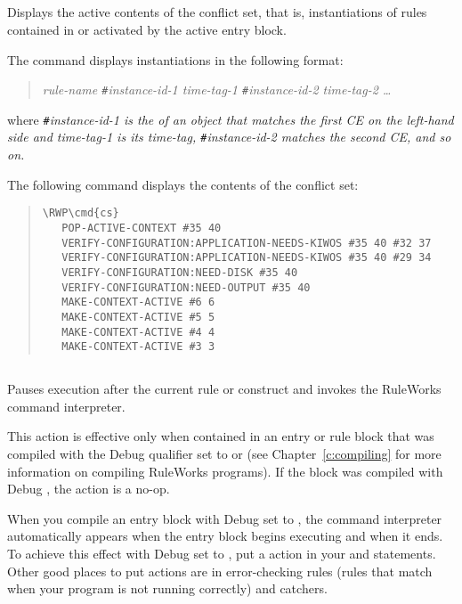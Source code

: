 \subsection{}

Displays the active contents of the conflict set, that is,
instantiations of rules contained in or activated by the active entry
block.

The command displays instantiations in the following format:
\begin{quote}
  \it{rule-name} \verb|#|\it{instance-id-1} \it{time-tag-1}
  \verb|#|\it{instance-id-2} \it{time-tag-2} \ldots
\end{quote}
where \verb|#|\it{instance-id-1} is the  of an object
that matches the first CE on the left-hand side and \it{time-tag-1} is
its time-tag, \verb|#|\it{instance-id-2} matches the second CE, and so
on.

\Format


\Example

The following command displays the contents of the conflict set:

\begin{quote}
\begin{Verbatim}[commandchars=\\\{\}]
\RWP\cmd{cs}
   POP-ACTIVE-CONTEXT #35 40
   VERIFY-CONFIGURATION:APPLICATION-NEEDS-KIWOS #35 40 #32 37
   VERIFY-CONFIGURATION:APPLICATION-NEEDS-KIWOS #35 40 #29 34
   VERIFY-CONFIGURATION:NEED-DISK #35 40
   VERIFY-CONFIGURATION:NEED-OUTPUT #35 40
   MAKE-CONTEXT-ACTIVE #6 6
   MAKE-CONTEXT-ACTIVE #5 5
   MAKE-CONTEXT-ACTIVE #4 4
   MAKE-CONTEXT-ACTIVE #3 3
\end{Verbatim}
\end{quote}

\subsection{}

Pauses execution after the current rule or  construct and
invokes the RuleWorks command interpreter.

This action is effective only when contained in an entry or rule block
that was compiled with the Debug qualifier set to  or
 (see Chapter~\ref{c:compiling} for more information on
compiling RuleWorks programs). If the block was compiled with Debug
, the  action is a no-op.

When you compile an entry block with Debug set to , the
command interpreter automatically appears when the entry block begins
executing and when it ends. To achieve this effect with Debug set to
, put a  action in your  and
 statements. Other good places to put  actions
are in error-checking rules (rules that match when your program is not
running correctly) and catchers.

